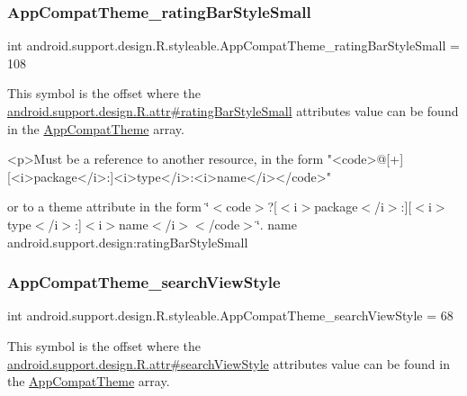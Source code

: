 \subsubsection{\texorpdfstring{App\+Compat\+Theme\+\_\+rating\+Bar\+Style\+Small}{AppCompatTheme\_ratingBarStyleSmall}}
{\footnotesize\ttfamily int android.\+support.\+design.\+R.\+styleable.\+App\+Compat\+Theme\+\_\+rating\+Bar\+Style\+Small = 108\hspace{0.3cm}{\ttfamily [static]}}

This symbol is the offset where the \hyperlink{classandroid_1_1support_1_1design_1_1R_1_1attr_a5d864933e2126f8bb0abceec75b67646}{android.\+support.\+design.\+R.\+attr\#rating\+Bar\+Style\+Small} attribute\textquotesingle{}s value can be found in the \hyperlink{classandroid_1_1support_1_1design_1_1R_1_1styleable_afb351dc8de20cbd4c89abe360373010c}{App\+Compat\+Theme} array.

\begin{DoxyVerb}      <p>Must be a reference to another resource, in the form "<code>@[+][<i>package</i>:]<i>type</i>:<i>name</i></code>"
\end{DoxyVerb}
 or to a theme attribute in the form \char`\"{}$<$code$>$?\mbox{[}$<$i$>$package$<$/i$>$\+:\mbox{]}\mbox{[}$<$i$>$type$<$/i$>$\+:\mbox{]}$<$i$>$name$<$/i$>$$<$/code$>$\char`\"{}.  name android.\+support.\+design\+:rating\+Bar\+Style\+Small \mbox{\label{classandroid_1_1support_1_1design_1_1R_1_1styleable_a7f20a034b36b7ab747f54d15503472b8}} 
\subsubsection{\texorpdfstring{App\+Compat\+Theme\+\_\+search\+View\+Style}{AppCompatTheme\_searchViewStyle}}
{\footnotesize\ttfamily int android.\+support.\+design.\+R.\+styleable.\+App\+Compat\+Theme\+\_\+search\+View\+Style = 68\hspace{0.3cm}{\ttfamily [static]}}

This symbol is the offset where the \hyperlink{classandroid_1_1support_1_1design_1_1R_1_1attr_a7563597120eec32553578260707cea59}{android.\+support.\+design.\+R.\+attr\#search\+View\+Style} attribute\textquotesingle{}s value can be found in the \hyperlink{classandroid_1_1support_1_1design_1_1R_1_1styleable_afb351dc8de20cbd4c89abe360373010c}{App\+Compat\+Theme} array.

